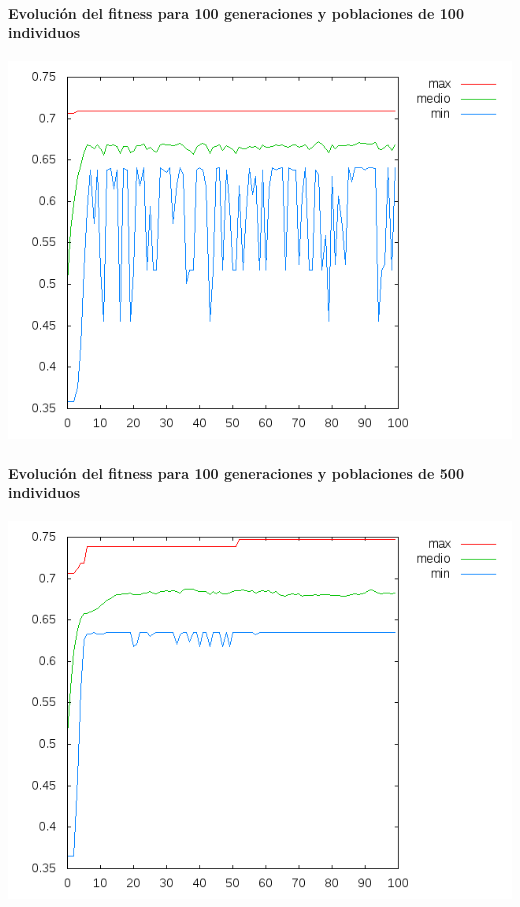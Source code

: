 \documentclass[nochap]{apuntes}
\begin{document}
\paragraph{Evolución del fitness para 100 generaciones y poblaciones de 100 individuos}
\begin{center}
\includegraphics[scale=0.6]{tex/img/g100_p100_ReemplazoTotal_SeleccionProporcionalAlFitness_reg11.png}
\end{center}
\paragraph{Evolución del fitness para 100 generaciones y poblaciones de 500 individuos}
\begin{center}
\includegraphics[scale=0.6]{tex/img/g100_p500_ReemplazoTotal_SeleccionProporcionalAlFitness_reg11.png}
\end{center}
\end{document}
